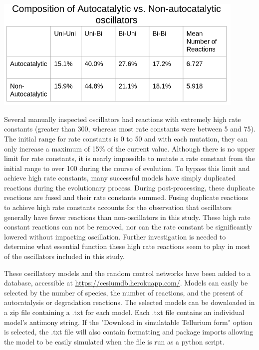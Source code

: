 \documentclass[12pt]{report}
\begin{document}
\begin{center}
    \includegraphics[width=12cm]{images/autocomp.png}
    \label{fig:autocatal}
\end{center}

Several manually inspected oscillators had reactions with extremely high rate constants (greater than 300, whereas most rate constants were between 5 and 75). The initial range for rate constants is 0 to 50 and with each mutation, they can only increase a maximum of 15\% of the current value. Although there is no upper limit for rate constants, it is nearly impossible to mutate a rate constant from the initial range to over 100 during the course of evolution. To bypass this limit and achieve high rate constants, many successful models have simply duplicated reactions during the evolutionary process. During post-processing, these duplicate reactions are fused and their rate constants summed. Fusing duplicate reactions to achieve high rate constants accounts for the observation that oscillators generally have fewer reactions than non-oscillators in this study. These high rate constant reactions can not be removed, nor can the rate constant be significantly lowered without impacting oscillation. Further investigation is needed to determine what essential function these high rate reactions seem to play in most of the oscillators included in this study. 


These oscillatory models and the random control networks have been added to a database, accessible at \url{https://cesiumdb.herokuapp.com/}. Models can easily be selected by the number of species, the number of reactions, and the present of autocatalysis or degradation reactions. The selected models can be downloaded in a zip file containing a .txt for each model. Each .txt file contains an individual model's antimony string. If the "Download in simulatable Tellurium form" option is selected, the .txt file will also contain formatting and package imports allowing the model to be easily simulated when the file is run as a python script. 
\end{document}

